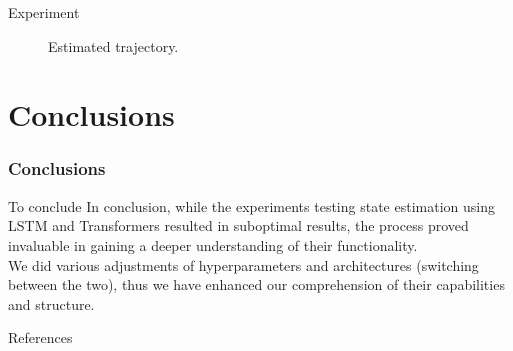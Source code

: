 \documentclass[aspectratio=169,t,xcolor=table]{beamer}
\begin{document}
\begin{frame}[allowframebreaks]{Experiment}
\begin{figure}[!htb]
\begin{center}
\begin{minipage}{0.45\textwidth}
            \caption{Estimated trajectory.}\label{graph4}
        \end{minipage}
    \end{center}
\end{figure}
\end{frame}

\section{Conclusions}

\begin{frame}{}
    \frametitle{Conclusions}
\end{frame}

\begin{frame}{To conclude}
    In conclusion, while the experiments testing state estimation using LSTM and Transformers resulted in suboptimal results, the process proved invaluable in gaining a deeper understanding of their functionality.\\ \vspace{5mm} We did various adjustments of hyperparameters and architectures (switching between the two), thus we have enhanced our comprehension of their capabilities and structure.
\end{frame}

\begin{frame}[allowframebreaks]{References}
    \nocite{*} 
    \printbibliography
\end{frame}
\end{document}
